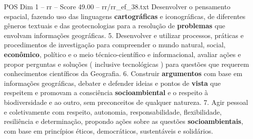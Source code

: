 \begin{textsample}{POS Dim 1 – rr – Score 49.00 – rr/rr\_ef\_38.txt}
Desenvolver o pensamento espacial, fazendo uso das linguagens \textbf{cartográficas} e iconográficas, de diferentes gêneros textuais e das geotecnologias para a resolução de \textbf{problemas} que envolvam informações geográficas. 5.
Desenvolver e utilizar processos, práticas e procedimentos de investigação para compreender o mundo natural, social, \textbf{econômico}, político e o meio técnico-científico e informacional, avaliar ações e propor perguntas e soluções ( inclusive tecnológicas ) para questões que requerem conhecimentos científicos da Geografia. 6.
Construir \textbf{argumentos} com base em informações geográficas, debater e defender ideias e pontos de \textbf{vista} que respeitem e promovam a consciência \textbf{socioambiental} e o respeito à biodiversidade e ao outro, sem preconceitos de qualquer natureza. 7.
Agir pessoal e coletivamente com respeito, autonomia, responsabilidade, flexibilidade, resiliência e determinação, propondo ações sobre as questões \textbf{socioambientais}, com base em princípios éticos, democráticos, sustentáveis e solidários.

\end{textsample}

